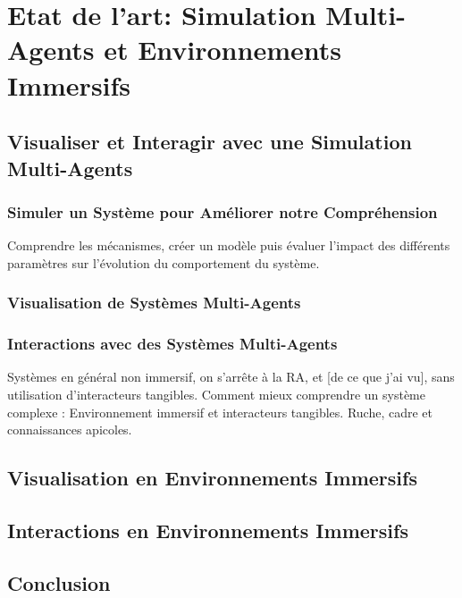 \chapter{Etat de l'art: Simulation Multi-Agents et Environnements Immersifs}
	\section{Visualiser et Interagir avec une Simulation Multi-Agents}
		\subsection{Simuler un Système pour Améliorer notre Compréhension}
		Comprendre les mécanismes, créer un modèle puis évaluer l'impact des différents paramètres sur l'évolution du comportement du système.
		\subsection{Visualisation de Systèmes Multi-Agents}
		\subsection{Interactions avec des Systèmes Multi-Agents}
		Systèmes en général non immersif, on s'arrête à la RA, et [de ce que j'ai vu], sans utilisation d'interacteurs tangibles.
	Comment mieux comprendre un système complexe : Environnement immersif et interacteurs tangibles. Ruche, cadre et connaissances apicoles.
	\section{Visualisation en Environnements Immersifs}
	\section{Interactions en Environnements Immersifs}			
	\section*{Conclusion}